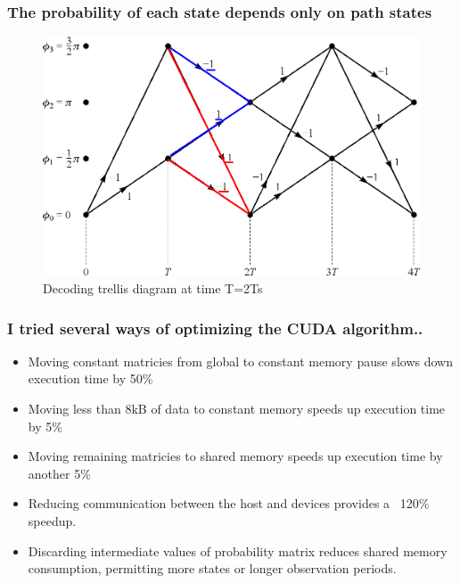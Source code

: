 \documentclass{beamer}
\begin{document}
    \begin{frame}
        \frametitle{The probability of each state depends only on path states}
        \begin{figure}
            \includegraphics[width=.8\textwidth]{figures/cpmfulltrelliscolored.png}
            \caption{Decoding trellis diagram at time T=2Ts}
        \end{figure}
    \end{frame}
   
    \begin{frame}
    \frametitle{I tried several ways of optimizing the CUDA algorithm..}
    \begin{itemize}
        \item Moving constant matricies from global to constant memory pause slows down execution time by 50\%
        \item Moving less than 8kB of data to constant memory speeds up execution time by 5\%
        \item Moving remaining matricies to shared memory speeds up execution time by another 5\%
        \item Reducing communication between the host and devices provides a ~120\% speedup.
        \item Discarding intermediate values of probability matrix reduces shared memory consumption, permitting more states or longer observation periods.
    \end{itemize}
    \end{frame}
\end{document}
